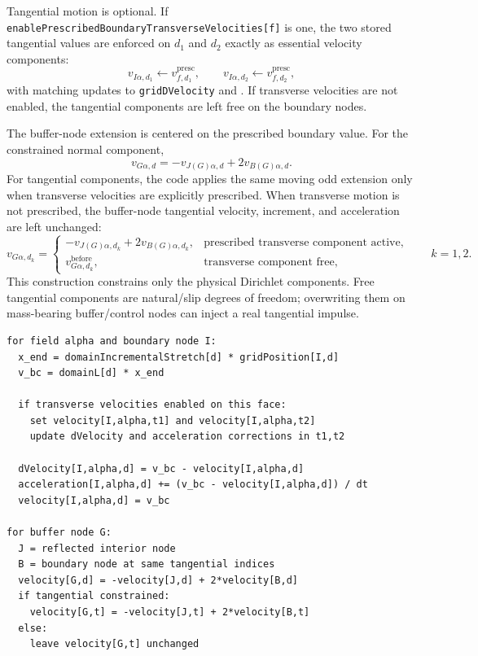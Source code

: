 Tangential motion is optional.  If \texttt{enablePrescribedBoundaryTransverseVelocities[f]} is one, the two stored tangential values are enforced on $d_1$ and $d_2$ exactly as essential velocity components:
\begin{equation}
  v_{I\alpha,d_1}\leftarrow v_{f,d_1}^{\mathrm{presc}},
  \qquad
  v_{I\alpha,d_2}\leftarrow v_{f,d_2}^{\mathrm{presc}},
  \label{eq:bc-moving-transverse}
\end{equation}
with matching updates to \texttt{gridDVelocity} and .  If transverse velocities are not enabled, the tangential components are left free on the boundary nodes.

The buffer-node extension is centered on the prescribed boundary value.  For the constrained normal component,
\begin{equation}
  v_{G\alpha,d}=-v_{J(G)\alpha,d}+2v_{B(G)\alpha,d}.
  \label{eq:bc-moving-buffer-normal}
\end{equation}
For tangential components, the code applies the same moving odd extension only when transverse velocities are explicitly prescribed.  When transverse motion is not prescribed, the buffer-node tangential velocity, increment, and acceleration are left unchanged:
\begin{equation}
  v_{G\alpha,d_k}=\begin{cases}
    -v_{J(G)\alpha,d_k}+2v_{B(G)\alpha,d_k}, & \text{prescribed transverse component active},\\
    v_{G\alpha,d_k}^{\mathrm{before}}, & \text{transverse component free},
  \end{cases}
  \qquad k=1,2.
  \label{eq:bc-moving-buffer-tangent}
\end{equation}
This construction constrains only the physical Dirichlet components.  Free tangential components are natural/slip degrees of freedom; overwriting them on mass-bearing buffer/control nodes can inject a real tangential impulse.

\begin{lstlisting}[caption={Moving-face enforcement.}]
for field alpha and boundary node I:
  x_end = domainIncrementalStretch[d] * gridPosition[I,d]
  v_bc = domainL[d] * x_end

  if transverse velocities enabled on this face:
    set velocity[I,alpha,t1] and velocity[I,alpha,t2]
    update dVelocity and acceleration corrections in t1,t2

  dVelocity[I,alpha,d] = v_bc - velocity[I,alpha,d]
  acceleration[I,alpha,d] += (v_bc - velocity[I,alpha,d]) / dt
  velocity[I,alpha,d] = v_bc

for buffer node G:
  J = reflected interior node
  B = boundary node at same tangential indices
  velocity[G,d] = -velocity[J,d] + 2*velocity[B,d]
  if tangential constrained:
    velocity[G,t] = -velocity[J,t] + 2*velocity[B,t]
  else:
    leave velocity[G,t] unchanged
\end{lstlisting}

